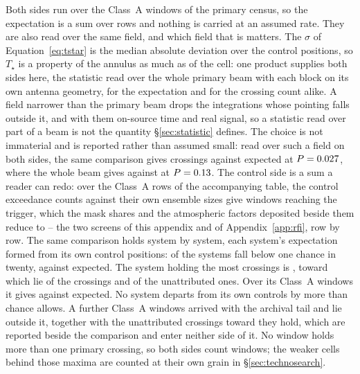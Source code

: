 Both sides run over the \CeNWin{} Class~A windows of the primary census, so
the expectation is a sum over rows and nothing is carried at an assumed rate.
They are also read over the same field, and which field that is matters.
The $\sigma$ of Equation~\ref{eq:tstar} is the median absolute deviation over
the control positions, so $T_\star$ is a property of the annulus as much as of
the cell: one product supplies both sides here, the statistic read over the
whole primary beam with each block on its own antenna geometry, for the
expectation and for the crossing count alike. A field narrower than the
primary beam drops the integrations whose pointing falls outside it, and with
them on-source time and real signal, so a statistic read over part of a beam
is not the quantity \S\ref{sec:statistic} defines. The choice is not
immaterial and is reported rather than assumed small: read over such a field
on both sides, the same comparison gives \FrNarrowObs{} crossings against
\FrNarrowExp{} expected at $P=0.027$, where the whole beam gives
\CeObs{} against \CeExp{} at $P=0.13$. The control side is a sum a
reader can redo: over the \CeNWin{} Class~A rows of the accompanying table,
the control exceedance counts against their own ensemble sizes give
\CeExpTrig{} windows reaching the trigger, which the mask shares and the
atmospheric factors deposited beside them reduce to \CeExp{} -- the two
screens of this appendix and of Appendix~\ref{app:rfi}, row by row.
The same comparison holds system by system, each system's expectation formed
from its own control positions: \MtNSysLowP{} of the \MtNSysChance{} systems
fall below one chance in twenty, against \MtNSysLowPExp{} expected. The system
holding the most crossings is \MtTopStar, toward which lie
\MtTopStarNCross{} of the \EvNCrossRaw{} crossings and \MtTopStarNUnattr{} of
the unattributed ones. Over its \MtTopSysNWin{} Class~A windows it gives
\MtTopSysObs{} against \MtTopSysExp{} expected. No system departs from its
own controls by more than chance allows.
A further \CeNWinTail{} Class~A windows arrived with the archival tail and lie
outside it, together with the \CeNTailCrossWord{} unattributed crossings
toward \CeTailStar{} they hold, which are reported beside the comparison and
enter neither side of it. No window holds more than one primary crossing, so
both sides count windows; the weaker cells behind those maxima are counted at
their own grain in \S\ref{sec:technosearch}.

